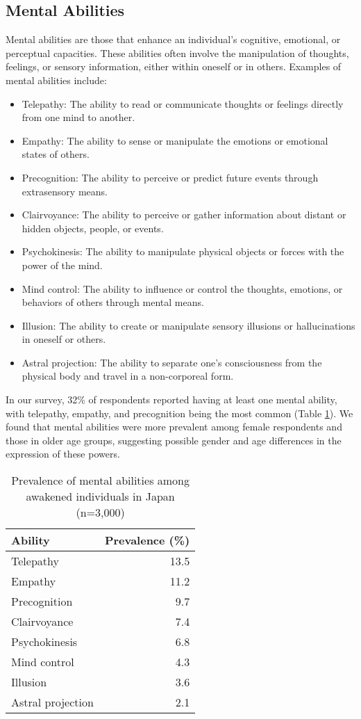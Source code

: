 \documentclass[12pt]{article}
\begin{document}
\subsection{Mental Abilities}
Mental abilities are those that enhance an individual's cognitive, emotional, or perceptual capacities. These abilities often involve the manipulation of thoughts, feelings, or sensory information, either within oneself or in others. Examples of mental abilities include:

\begin{itemize}
    \item Telepathy: The ability to read or communicate thoughts or feelings directly from one mind to another.
    \item Empathy: The ability to sense or manipulate the emotions or emotional states of others.
    \item Precognition: The ability to perceive or predict future events through extrasensory means.
    \item Clairvoyance: The ability to perceive or gather information about distant or hidden objects, people, or events.
    \item Psychokinesis: The ability to manipulate physical objects or forces with the power of the mind.
    \item Mind control: The ability to influence or control the thoughts, emotions, or behaviors of others through mental means.
    \item Illusion: The ability to create or manipulate sensory illusions or hallucinations in oneself or others.
    \item Astral projection: The ability to separate one's consciousness from the physical body and travel in a non-corporeal form.
\end{itemize}

In our survey, 32\% of respondents reported having at least one mental ability, with telepathy, empathy, and precognition being the most common (Table \ref{tab:mentalabilities}). We found that mental abilities were more prevalent among female respondents and those in older age groups, suggesting possible gender and age differences in the expression of these powers.

\begin{table}[h]
\centering
\caption{Prevalence of mental abilities among awakened individuals in Japan (n=3,000)}
\label{tab:mentalabilities}
\begin{tabular}{lr}
\toprule
Ability & Prevalence (\%) \\
\midrule
Telepathy & 13.5 \\
Empathy & 11.2 \\
Precognition & 9.7 \\
Clairvoyance & 7.4 \\
Psychokinesis & 6.8 \\
Mind control & 4.3 \\
Illusion & 3.6 \\
Astral projection & 2.1 \\
\bottomrule
\end{tabular}
\end{table}
\end{document}
